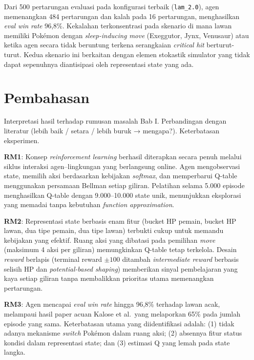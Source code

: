 \documentclass[11pt,a4paper,oneside]{report}
\begin{document}
Dari 500 pertarungan evaluasi pada konfigurasi terbaik (\texttt{lam\_2.0}), agen memenangkan 484 pertarungan dan kalah pada 16 pertarungan, menghasilkan \textit{eval win rate} 96,8\%. Kekalahan terkonsentrasi pada skenario di mana lawan memiliki Pokémon dengan \textit{sleep-inducing move} (Exeggutor, Jynx, Venusaur) atau ketika agen secara tidak beruntung terkena serangkaian \textit{critical hit} berturut-turut. Kedua skenario ini berkaitan dengan elemen stokastik simulator yang tidak dapat sepenuhnya diantisipasi oleh representasi state yang ada.


\section{Pembahasan}
\begin{petunjuk}
Interpretasi hasil terhadap rumusan masalah Bab I. Perbandingan dengan literatur (lebih baik / setara / lebih buruk → mengapa?). Keterbatasan eksperimen.
\end{petunjuk}

\textbf{RM1}: Konsep \textit{reinforcement learning} berhasil diterapkan secara penuh melalui siklus interaksi agen--lingkungan yang berlangsung online. Agen mengobservasi state, memilih aksi berdasarkan kebijakan \textit{softmax}, dan memperbarui Q-table menggunakan persamaan Bellman setiap giliran. Pelatihan selama 5.000 episode menghasilkan Q-table dengan 9.000--10.000 state unik, menunjukkan eksplorasi yang memadai tanpa kebutuhan \textit{function approximation}.

\textbf{RM2}: Representasi state berbasis enam fitur (bucket HP pemain, bucket HP lawan, dua tipe pemain, dua tipe lawan) terbukti cukup untuk memandu kebijakan yang efektif. Ruang aksi yang dibatasi pada pemilihan \textit{move} (maksimum 4 aksi per giliran) memungkinkan Q-table tetap terkelola. Desain \textit{reward} berlapis (terminal reward $\pm 100$ ditambah \textit{intermediate reward} berbasis selisih HP dan \textit{potential-based shaping}) memberikan sinyal pembelajaran yang kaya setiap giliran tanpa membalikkan prioritas utama memenangkan pertarungan.

\textbf{RM3}: Agen mencapai \textit{eval win rate} hingga 96,8\% terhadap lawan acak, melampaui hasil paper acuan Kalose et al.\ yang melaporkan 65\% pada jumlah episode yang sama. Keterbatasan utama yang diidentifikasi adalah: (1) tidak adanya mekanisme \textit{switch} Pokémon dalam ruang aksi; (2) absennya fitur status kondisi dalam representasi state; dan (3) estimasi Q yang lemah pada state langka.
\end{document}
